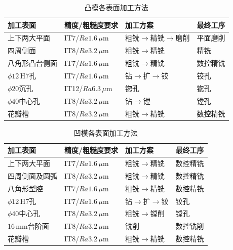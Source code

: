 \documentclass{xautCADreport}
\begin{document}
\begin{table}[H]
  \centering
  \caption{凸模各表面加工方法}
  \label{tab:surface_method_punch}
  \begin{tabular}{llll}
    \toprule
    加工表面 & 精度/粗糙度要求 & 加工方案 & 最终工序 \\
    \midrule
    上下两大平面 & IT7/$Ra1.6\,\mu\mathrm{m}$ & 粗铣$\to$精铣$\to$磨削 & 平面磨削 \\
    四周侧面 & IT8/$Ra3.2\,\mu\mathrm{m}$ & 粗铣$\to$精铣 & 精铣 \\
    八角形凸台侧面 & IT7/$Ra1.6\,\mu\mathrm{m}$ & 粗铣$\to$精铣 & 数控精铣 \\
    $\phi12\,\mathrm{H7}$孔 & IT7/$Ra1.6\,\mu\mathrm{m}$ & 钻$\to$扩$\to$铰 & 铰孔 \\
    $\phi20$沉孔 & IT12/$Ra6.3\,\mu\mathrm{m}$ & 锪孔 & 锪孔 \\
    $\phi40$中心孔 & IT8/$Ra3.2\,\mu\mathrm{m}$ & 钻$\to$镗 & 镗孔 \\
    花瓣槽 & IT8/$Ra3.2\,\mu\mathrm{m}$ & 粗铣$\to$精铣 & 数控精铣 \\
    \bottomrule
  \end{tabular}
\end{table}

\begin{table}[H]
  \centering
  \caption{凹模各表面加工方法}
  \label{tab:surface_method_die}
  \begin{tabular}{llll}
    \toprule
    加工表面 & 精度/粗糙度要求 & 加工方案 & 最终工序 \\
    \midrule
    上下两大平面 & IT7/$Ra1.6\,\mu\mathrm{m}$ & 粗铣$\to$精铣 & 数控精铣 \\
    四周侧面及圆弧 & IT8/$Ra3.2\,\mu\mathrm{m}$ & 粗铣$\to$精铣 & 数控精铣 \\
    八角形型腔 & IT7/$Ra1.6\,\mu\mathrm{m}$ & 粗铣$\to$精铣 & 数控精铣 \\
    $\phi12\,\mathrm{H7}$孔 & IT7/$Ra1.6\,\mu\mathrm{m}$ & 钻$\to$扩$\to$铰 & 铰孔 \\
    $\phi40$中心孔 & IT8/$Ra3.2\,\mu\mathrm{m}$ & 粗铣$\to$镗削 & 镗孔 \\
    $16\,\mathrm{mm}$台阶面 & IT8/$Ra3.2\,\mu\mathrm{m}$ & 铣削 & 数控铣削 \\
    花瓣槽 & IT8/$Ra3.2\,\mu\mathrm{m}$ & 粗铣$\to$精铣 & 数控精铣 \\
    \bottomrule
  \end{tabular}
\end{table}

\end{document}
